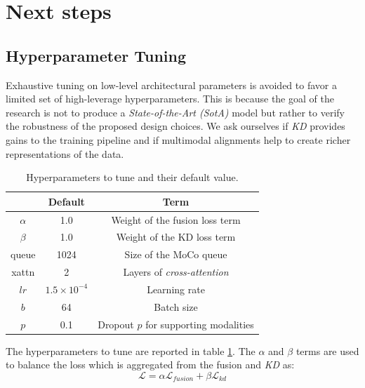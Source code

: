 



\section{Next steps}

\subsection{Hyperparameter Tuning}
Exhaustive tuning on low-level architectural parameters is avoided to favor a limited set of high-leverage hyperparameters.
This is because the goal of the research is not to produce a \textit{State-of-the-Art (SotA)} model but rather to verify the robustness of the proposed design choices.
We ask ourselves if \textit{KD} provides gains to the training pipeline and if multimodal alignments help to create richer representations of the data.

\begin{table}
    \centering

    \begin{tabular}{c|c|c}
        & Default              & Term                                  \\ \hline
        $\alpha$ & 1.0                  & Weight of the fusion loss term        \\
        $\beta$  & 1.0                  & Weight of the KD loss term            \\
        queue    & 1024                 & Size of the MoCo queue                \\
        xattn    & 2                    & Layers of \textit{cross-attention}    \\
        $lr$     & $1.5 \times 10^{-4}$ & Learning rate                         \\
        $b$      & 64                   & Batch size                            \\
        $p$      & 0.1                  & Dropout $p$ for supporting modalities
    \end{tabular}
    \caption{Hyperparameters to tune and their default value.}
    \label{tab:hp}
\end{table}

The hyperparameters to tune are reported in table \ref{tab:hp}.
The $\alpha$ and $\beta$ terms are used to balance the loss which is aggregated from the fusion and \textit{KD} as:
$$ \mathcal{L} = \alpha \mathcal{L}_{fusion}  + \beta \mathcal{L}_{kd}$$

